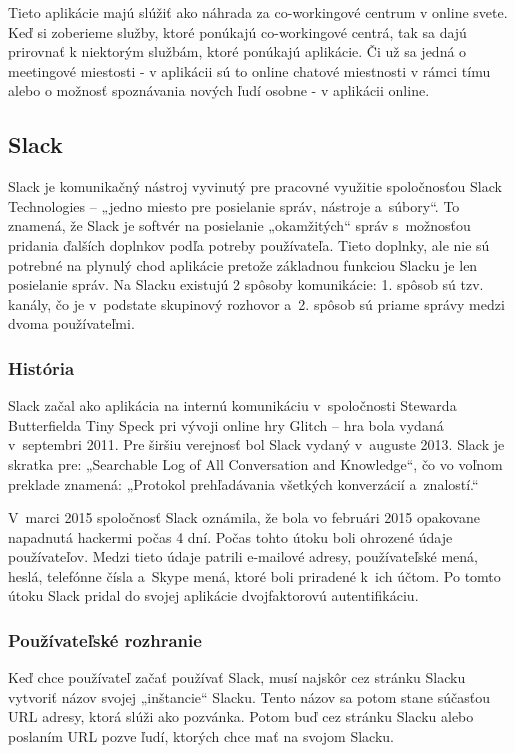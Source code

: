 \indent Tieto aplikácie majú slúžiť ako náhrada za co-workingové centrum v online svete. Keď si zoberieme služby, ktoré ponúkajú co-workingové centrá, tak sa dajú prirovnať k niektorým službám, ktoré ponúkajú aplikácie. Či už sa jedná o meetingové miestosti - v aplikácii sú to online chatové miestnosti v rámci tímu alebo o možnosť spoznávania nových ľudí osobne - v aplikácii online. 

\subsection{Slack}
\indent Slack je komunikačný nástroj vyvinutý pre pracovné využitie spoločnosťou Slack Technologies – „jedno miesto pre posielanie správ, nástroje a súbory“. To znamená, že Slack je softvér na posielanie „okamžitých“ správ s možnosťou pridania ďalších doplnkov podľa potreby používateľa. Tieto doplnky, ale nie sú potrebné na plynulý chod aplikácie pretože základnou funkciou Slacku je len posielanie správ. Na Slacku existujú 2 spôsoby komunikácie: 1. spôsob sú tzv. kanály, čo je v podstate skupinový rozhovor a 2. spôsob sú priame správy medzi dvoma používateľmi. 

\subsubsection{História}
\indent Slack začal ako aplikácia na internú komunikáciu v spoločnosti Stewarda Butterfielda Tiny Speck pri vývoji online hry Glitch – hra bola vydaná v septembri 2011. Pre širšiu verejnosť bol Slack vydaný v auguste 2013. Slack je skratka pre: „Searchable Log of All Conversation and Knowledge“, čo vo voľnom preklade znamená: „Protokol prehľadávania všetkých konverzácií a znalostí.“

\indent V marci 2015 spoločnosť Slack oznámila, že bola vo februári 2015 opakovane napadnutá hackermi počas 4 dní. Počas tohto útoku boli ohrozené údaje používateľov. Medzi tieto údaje patrili e-mailové adresy, používateľské mená, heslá, telefónne čísla a Skype mená, ktoré boli priradené k ich účtom. Po tomto útoku Slack pridal do svojej aplikácie dvojfaktorovú autentifikáciu. 

\subsubsection{Používateľské rozhranie}
\indent Keď chce používateľ začať používať Slack, musí najskôr cez stránku Slacku vytvoriť názov svojej „inštancie“ Slacku. Tento názov sa potom stane súčasťou URL adresy, ktorá slúži ako pozvánka. Potom buď cez stránku Slacku alebo poslaním URL pozve ľudí, ktorých chce mať na svojom Slacku. 

